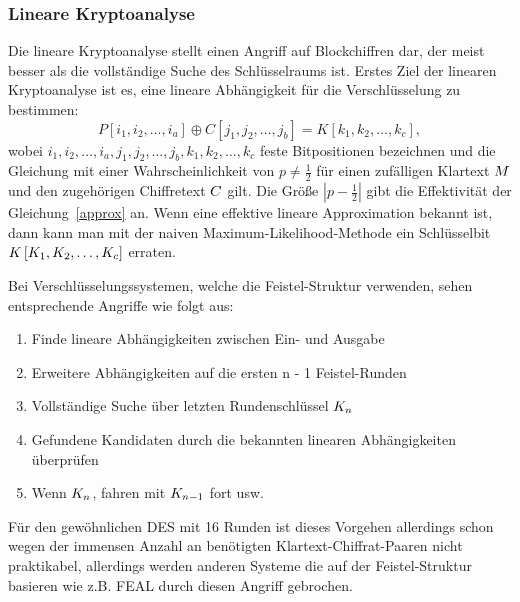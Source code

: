 \subsubsection{Lineare Kryptoanalyse}
Die lineare Kryptoanalyse stellt einen Angriff auf Blockchiffren dar, der meist besser als die vollständige Suche des Schlüsselraums ist. Erstes Ziel der
linearen Kryptoanalyse ist es, eine lineare Abhängigkeit für die Verschlüsselung zu bestimmen:
\begin{equation}
  P \left[ i_1, i_2, \ldots, i_a \right] \oplus C \left[ j_1, j_2, \ldots, j_b \right]  = K \left[ k_1, k_2, \ldots, k_c \right], \label{approx}
\end{equation}
wobei  $i_1, i_2, \ldots, i_a, j_1, j_2, \ldots, j_b,k_1, k_2, \ldots, k_c$ feste Bitpositionen bezeichnen und die Gleichung mit einer Wahrscheinlichkeit von
$p\neq \frac{1}{2}$ für einen zufälligen Klartext $M$ und den zugehörigen Chiffretext $C$ gilt. Die Größe $\left|{p-\frac{1}{2}}\right|$ gibt die
Effektivität der Gleichung~\ref{approx} an. Wenn eine effektive lineare Approximation bekannt ist, dann kann man mit der naiven Maximum-Likelihood-Methode ein
Schlüsselbit $K \left[ K_1, K_2, \ldots, K_c \right]$ erraten.

Bei Verschlüsselungssystemen, welche die Feistel-Struktur verwenden, sehen entsprechende Angriffe wie folgt aus:
\begin{enumerate}
	\item Finde lineare Abhängigkeiten zwischen Ein- und Ausgabe
	\item Erweitere Abhängigkeiten auf die ersten n - 1 Feistel-Runden
	\item Vollständige Suche über letzten Rundenschlüssel $K_n$
	\item Gefundene Kandidaten durch die bekannten linearen Abhängigkeiten überprüfen
	\item Wenn $K_n$, fahren mit $K_{n-1}$ fort usw.
\end{enumerate}

Für den gewöhnlichen DES mit 16 Runden ist dieses Vorgehen allerdings schon wegen der immensen Anzahl an benötigten Klartext-Chiffrat-Paaren nicht praktikabel,
allerdings werden anderen Systeme die auf der Feistel-Struktur basieren wie z.B. FEAL durch diesen Angriff gebrochen.


